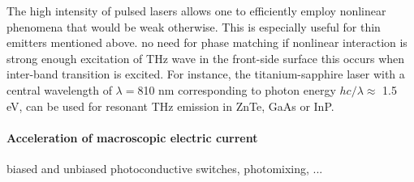 The high intensity of pulsed lasers allows one to efficiently employ nonlinear phenomena that would be weak otherwise. This is especially useful for thin emitters mentioned above. 
no need for phase matching if nonlinear interaction is strong enough excitation of THz wave in the front-side surface
this occurs when inter-band transition is excited. For instance, the titanium-sapphire laser with a central wavelength of $\lambda = $810 nm corresponding to photon energy $hc/\lambda \approx$ 1.5 eV, can be used for resonant THz emission in ZnTe, GaAs or InP.%


\paragraph{Acceleration of macroscopic electric current}
 biased and unbiased photoconductive switches, photomixing, ...

